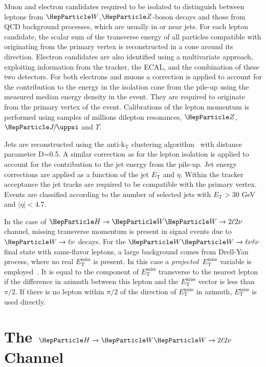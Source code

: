 \documentclass{cimento}
\newcommand{\cPZ}{\PZ} %
\newcommand{\ET}{\ensuremath{E_{\mathrm{T}}}\xspace}
\newcommand{\ETm}{\ensuremath{E_{\mathrm{T}}^{\text{miss}}}\xspace}
\newcommand{\hwwtl}{\ensuremath{\PH\to\PW\PW\to2\ell2\nu}}
\begin{document}
Muon and electron candidates required to be isolated to distinguish
between leptons from $\PW$,$\cPZ$-boson decays and those from QCD
background processes, which are usually in or near jets. For each
lepton candidate, the scalar sum of the transverse energy of all
particles compatible with originating from the primary vertex is
reconstructed in a cone around its direction.  Electron candidates are
also identified using a multivariate approach, exploiting information
from the tracker, the ECAL, and the combination of these two
detectors.  For both electrons and muons a correction is applied to
account for the contribution to the energy in the isolation cone from
the pile-up using the measured median energy density in the
event. They are required to originate from the primary vertex of the
event. Calibrations of the lepton momentum is performed using samples
of millions dilepton resonances, $\cPZ$, $\PJGy$ and $\Upsilon$.

Jets are reconstructed using the anti-$\mathrm{k_T}$ clustering
algorithm~\cite{antikt} with distance parameter D=0.5.  A similar
correction as for the lepton isolation is applied to account for the
contribution to the jet energy from the pile-up. Jet energy
corrections are applied as a function of the jet $\ET$ and $\eta$.
Within the tracker acceptance the jet tracks are required to be
compatible with the primary vertex. Events are classified according to
the number of selected jets with $\ET>30$ GeV and $|\eta|<$4.7.

In the case of $\hwwtl$ channel,
missing transverse momentum is present in signal events due to
$\PW\to\ell\nu$ decays.  For the $\PW\PW\to\ell\nu\ell\nu$ final state
with same-flavor leptons, a large background comes from Drell-Yan
process, where no real $\ETm$ is present. In this case a
\textit{projected}~$\ETm$ variable is employed~\cite{HWW2011}. 
It is equal to the component of $\ETm$ transverse to the nearest
lepton if the difference in azimuth between this lepton and the $\ETm$
vector is less than $\pi/2$. If there is no lepton within $\pi/2$ of
the direction of $\ETm$ in azimuth, $\ETm$ is used directly.  

\section{The $\hwwtl$ Channel}
\label{sec:hww2l2nu}
\end{document}
